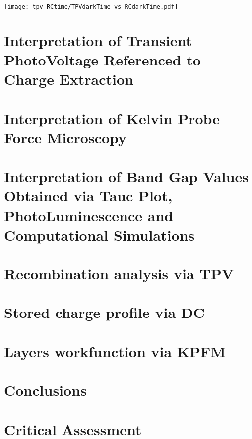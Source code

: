 \begin{SCfigure}
	\centering
	\texttt{[image: tpv\_RCtime/TPVdarkTime\_vs\_RCdarkTime.pdf]}
	\label{fig:tpv_RCtime}
\end{SCfigure}

\section{Interpretation of Transient PhotoVoltage Referenced to Charge Extraction}\label{interpretation_tpvce}

\section{Interpretation of Kelvin Probe Force Microscopy}\label{interpretation_kpfm}

\section{Interpretation of Band Gap Values Obtained via Tauc Plot, PhotoLuminescence and Computational Simulations}\label{interpretation_bg}



\section{Recombination analysis via TPV}
\section{Stored charge profile via DC}
\section{Layers workfunction via KPFM}
\section{Conclusions}
\section{Critical Assessment}